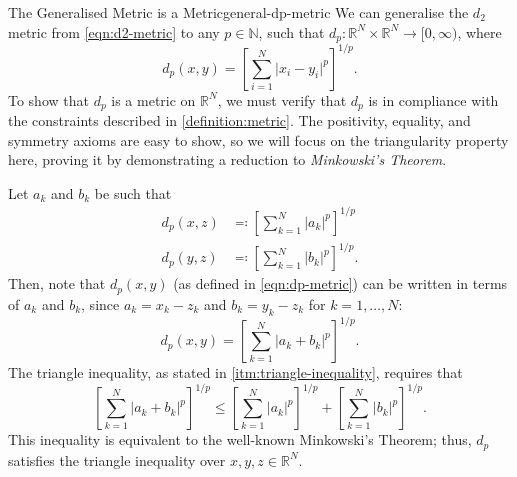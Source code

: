 \documentclass{article}
\numberwithin{equation}{section}
\numberwithin{enumi}{section}
\begin{document}
\begin{theorem}{The Generalised Metric is a Metric}{general-dp-metric}
    We can generalise the $d_2$ metric from \cref{eqn:d2-metric} to any $ p
    \in \mathbb{N} $, such that $ d_p \colon \mathbb{R}^N \times \mathbb{R}^N
    \to [0, \infty) $, where
    \begin{equation}
        d_p(x, y) = \left[\sum_{i=1}^N \vert x_i - y_i \vert^p\right]^{1/p}.
        \label{eqn:dp-metric}
    \end{equation}
    To show that $ d_p $ is a metric on $ \mathbb{R}^N $, we must verify that $
    d_p $ is in compliance with the constraints described in
    \cref{definition:metric}. The positivity, equality, and symmetry axioms are
    easy to show, so we will focus on the triangularity property here, proving
    it by demonstrating a reduction to \emph{Minkowski's Theorem}.

    Let $ a_k $ and $ b_k $ be such that
    \begin{align}
        d_p(x, z) &\eqcolon \left[\sum_{k=1}^N \vert a_k \vert^p\right]^{1/p} \\
        d_p(y, z) &\eqcolon \left[\sum_{k=1}^N \vert b_k \vert^p\right]^{1/p}.
    \end{align}
    Then, note that $ d_p(x, y) $ (as defined in \cref{eqn:dp-metric}) can be
    written in terms of $ a_k $ and $ b_k $, since $ a_k = x_k - z_k $ and $ b_k
    = y_k - z_k $ for $ k = 1, \ldots, N $:
    \begin{equation}
        d_p(x, y) = \left[\sum_{k=1}^N \vert a_k + b_k \vert^p\right]^{1/p}.
    \end{equation}
    The triangle inequality, as stated in \cref{itm:triangle-inequality},
    requires that
    \begin{equation}
        \left[\sum_{k=1}^N \vert a_k + b_k \vert^p\right]^{1/p} \leq
        \left[\sum_{k=1}^N \vert a_k \vert^p\right]^{1/p} +
        \left[\sum_{k=1}^N \vert b_k \vert^p\right]^{1/p}.
    \end{equation}
    This inequality is equivalent to the well-known Minkowski's Theorem; thus,
    $ d_p $ satisfies the triangle inequality over $ x, y, z \in \mathbb{R}^N $.
\end{theorem}
\end{document}
